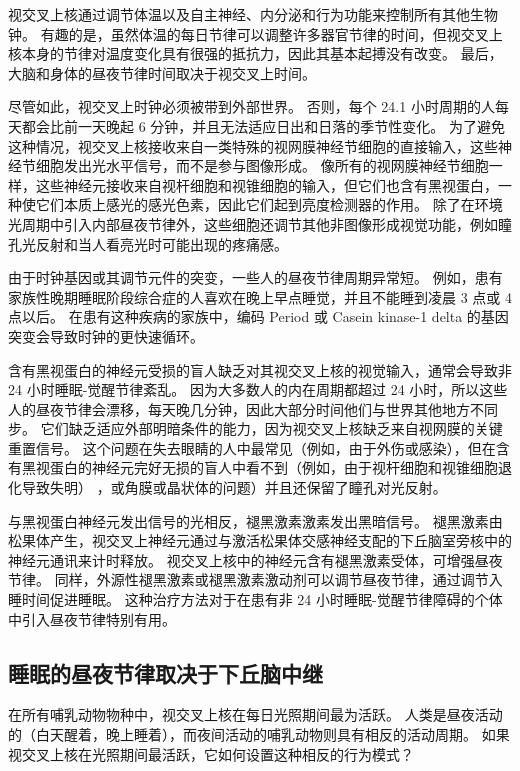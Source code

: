 视交叉上核通过调节体温以及自主神经、内分泌和行为功能来控制所有其他生物钟。
有趣的是，虽然体温的每日节律可以调整许多器官节律的时间，但视交叉上核本身的节律对温度变化具有很强的抵抗力，因此其基本起搏没有改变。
最后，大脑和身体的昼夜节律时间取决于视交叉上时间。


尽管如此，视交叉上时钟必须被带到外部世界。
否则，每个 24.1 小时周期的人每天都会比前一天晚起 6 分钟，并且无法适应日出和日落的季节性变化。
为了避免这种情况，视交叉上核接收来自一类特殊的视网膜神经节细胞的直接输入，这些神经节细胞发出光水平信号，而不是参与图像形成。
像所有的视网膜神经节细胞一样，这些神经元接收来自视杆细胞和视锥细胞的输入，但它们也含有黑视蛋白，一种使它们本质上感光的感光色素，因此它们起到亮度检测器的作用。
除了在环境光周期中引入内部昼夜节律外，这些细胞还调节其他非图像形成视觉功能，例如瞳孔光反射和当人看亮光时可能出现的疼痛感。


由于时钟基因或其调节元件的突变，一些人的昼夜节律周期异常短。
例如，患有家族性晚期睡眠阶段综合症的人喜欢在晚上早点睡觉，并且不能睡到凌晨 3 点或 4 点以后。
在患有这种疾病的家族中，编码 Period 或 Casein kinase-1 delta 的基因突变会导致时钟的更快速循环。


含有黑视蛋白的神经元受损的盲人缺乏对其视交叉上核的视觉输入，通常会导致非 24 小时睡眠-觉醒节律紊乱。
因为大多数人的内在周期都超过 24 小时，所以这些人的昼夜节律会漂移，每天晚几分钟，因此大部分时间他们与世界其他地方不同步。
它们缺乏适应外部明暗条件的能力，因为视交叉上核缺乏来自视网膜的关键重置信号。
这个问题在失去眼睛的人中最常见（例如，由于外伤或感染），但在含有黑视蛋白的神经元完好无损的盲人中看不到（例如，由于视杆细胞和视锥细胞退化导致失明） ，或角膜或晶状体的问题）并且还保留了瞳孔对光反射。


与黑视蛋白神经元发出信号的光相反，褪黑激素激素发出黑暗信号。
褪黑激素由松果体产生，视交叉上神经元通过与激活松果体交感神经支配的下丘脑室旁核中的神经元通讯来计时释放。
视交叉上核中的神经元含有褪黑激素受体，可增强昼夜节律。
同样，外源性褪黑激素或褪黑激素激动剂可以调节昼夜节律，通过调节入睡时间促进睡眠。
这种治疗方法对于在患有非 24 小时睡眠-觉醒节律障碍的个体中引入昼夜节律特别有用。



\subsection{睡眠的昼夜节律取决于下丘脑中继}

在所有哺乳动物物种中，视交叉上核在每日光照期间最为活跃。
人类是昼夜活动的（白天醒着，晚上睡着），而夜间活动的哺乳动物则具有相反的活动周期。
如果视交叉上核在光照期间最活跃，它如何设置这种相反的行为模式？


